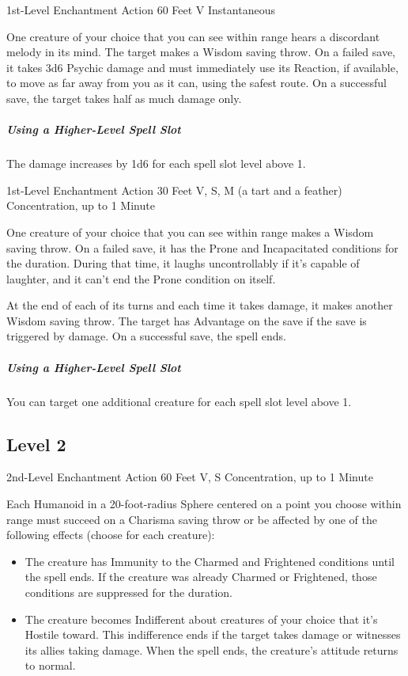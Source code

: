 \documentclass[letterpaper,openany,oneside,twocolumn]{book}
\begin{document}
	{1st-Level Enchantment}
	{Action}
	{60 Feet}
	{V}
	{Instantaneous}

One creature of your choice that you can see within range hears a discordant melody in its mind. The target makes a Wisdom saving throw. On a failed save, it takes 3d6 Psychic damage and must immediately use its Reaction, if available, to move as far away from you as it can, using the safest route. On a successful save, the target takes half as much damage only.

\subparagraph*{Using a Higher-Level Spell Slot} The damage increases by 1d6 for each spell slot level above 1.

	{1st-Level Enchantment}
	{Action}
	{30 Feet}
	{V, S, M (a tart and a feather)}
	{Concentration, up to 1 Minute}

One creature of your choice that you can see within range makes a Wisdom saving throw. On a failed save, it has the Prone and Incapacitated conditions for the duration. During that time, it laughs uncontrollably if it's capable of laughter, and it can't end the Prone condition on itself.

At the end of each of its turns and each time it takes damage, it makes another Wisdom saving throw. The target has Advantage on the save if the save is triggered by damage. On a successful save, the spell ends.

\subparagraph*{Using a Higher-Level Spell Slot} You can target one additional creature for each spell slot level above 1.

\subsection*{Level 2}

	{2nd-Level Enchantment}
	{Action}
	{60 Feet}
	{V, S}
	{Concentration, up to 1 Minute}

Each Humanoid in a 20-foot-radius Sphere centered on a point you choose within range must succeed on a Charisma saving throw or be affected by one of the following effects (choose for each creature):

\begin{itemize}
	\item The creature has Immunity to the Charmed and Frightened conditions until the spell ends. If the creature was already Charmed or Frightened, those conditions are suppressed for the duration.
	\item The creature becomes Indifferent about creatures of your choice that it's Hostile toward. This indifference ends if the target takes damage or witnesses its allies taking damage. When the spell ends, the creature's attitude returns to normal.
\end{itemize}
\end{document}
